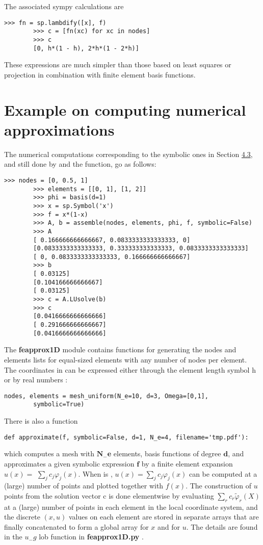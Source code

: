 \documentclass[../main.tex]{subfiles}
\begin{document}
	The associated sympy calculations are
	\begin{lstlisting}[numbers=none]
		>>> fn = sp.lambdify([x], f)
		>>> c = [fn(xc) for xc in nodes]
		>>> c
		[0, h*(1 - h), 2*h*(1 - 2*h)]
	\end{lstlisting}
	These expressions are much simpler than those based on least squares or projection in combination with finite element basis functions.
	\section[Example on computing numerical approximations]{Example on computing numerical approximations}
	\label{sec:sec_4_5}
	The numerical computations corresponding to the symbolic ones in Section \hyperref[sec:sec_4_3]{4.3},
	and still done by  and the  function, go as follows:
	\begin{lstlisting}[numbers=none]
		>>> nodes = [0, 0.5, 1]
		>>> elements = [[0, 1], [1, 2]]
		>>> phi = basis(d=1)
		>>> x = sp.Symbol('x')
		>>> f = x*(1-x)
		>>> A, b = assemble(nodes, elements, phi, f, symbolic=False)
		>>> A
		[ 0.166666666666667, 0.0833333333333333, 0]
		[0.0833333333333333, 0.333333333333333, 0.0833333333333333]
		[ 0, 0.0833333333333333, 0.166666666666667]
		>>> b
		[ 0.03125]
		[0.104166666666667]
		[ 0.03125]
		>>> c = A.LUsolve(b)
		>>> c
		[0.0416666666666666]
		[ 0.291666666666667]
		[0.0416666666666666]	
	\end{lstlisting}
	The \textbf{fe\textunderscore approx1D}  module contains functions for generating the nodes and
	elements lists for equal-sized elements with any number of nodes per element.
	The coordinates in  can be expressed either through the element length
	symbol h  or by real numbers :
	\begin{lstlisting}[numbers=none]
		nodes, elements = mesh_uniform(N_e=10, d=3, Omega=[0,1],
		symbolic=True)	
	\end{lstlisting}
	There is also a function
	\begin{lstlisting}[numbers=none]
		def approximate(f, symbolic=False, d=1, N_e=4, filename='tmp.pdf'):
	\end{lstlisting}
	which computes a mesh with  $\mathrm{\textbf{N}}_{-}$\textbf{e} elements, basis functions of degree $\mathrm{\textbf{d}}$, and approximates a given symbolic expression $\mathrm{\textbf{f}}$ by a finite element expansion $u(x)=$ $\sum_{j} c_{j} \varphi_{j}(x)$. When  is , $u(x)=\sum_{j} c_{j} \varphi_{j}(x)$ can be computed at a (large) number of points and plotted together with $f(x)$. The construction of $u$ points from the solution vector $\mathrm{c}$ is done elementwise by evaluating $\sum_{r} c_{r} \tilde{\varphi}_{r}(X)$ at a (large) number of points in each element in the local coordinate system, and the discrete $(x, u)$ values on each element are stored in separate arrays that are finally concatenated to form a global array for $x$ and for $u$. The details are found in the $u_{-} g$ lob function in \textbf{fe\textunderscore approx1D.py} .
\end{document}
